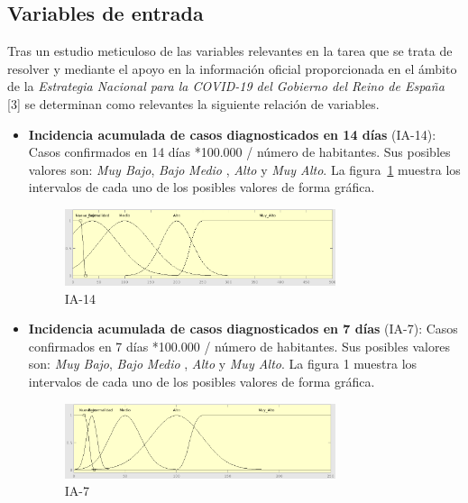 \documentclass[12pt,a4paper, xcolor=table]{article}
\begin{document}
\subsection{Variables de entrada}
Tras un estudio meticuloso de las variables relevantes en la tarea que se trata de resolver y mediante el apoyo en la información oficial proporcionada en el ámbito de la \textit{Estrategia Nacional para la COVID-19 del Gobierno del Reino de España} [3] se determinan como relevantes la siguiente relación de variables.

\begin{itemize}

    \item \textbf{Incidencia acumulada de casos diagnosticados en 14 días} (IA-14): Casos confirmados en 14 días *100.000 / número de habitantes. Sus posibles valores son: \textit{Muy Bajo}, \textit{Bajo} \textit{Medio }, {\textit{Alto}} y {\textit{Muy Alto}}. La figura~\ref{IA-14} muestra los intervalos de cada uno de los posibles valores de forma gráfica.

    \begin{figure}[!h]
      \centering
      \includegraphics[width=300px]{img/ia_ac_14.png}
      \caption{IA-14}
      \label{IA-14}
    \end{figure}

    \item \textbf{Incidencia acumulada de casos diagnosticados en 7 días} (IA-7): Casos confirmados en 7 días *100.000 / número de habitantes. Sus posibles valores son: \textit{Muy Bajo}, \textit{Bajo} \textit{Medio }, {\textit{Alto}} y {\textit{Muy Alto}}. La figura 1 muestra los intervalos de cada uno de los posibles valores de forma gráfica.

    \begin{figure}[!h]
      \centering
      \includegraphics[width=300px]{img/ia_ac_7.png}
      \caption{IA-7}
      \label{IA-7}
    \end{figure}


\end{itemize}
\end{document}
